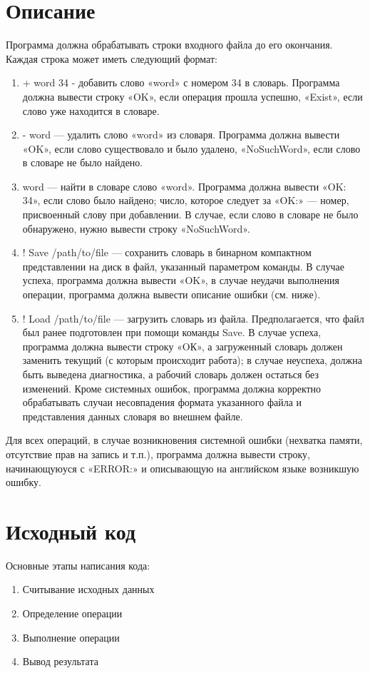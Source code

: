 \section{Описание}
Программа должна обрабатывать строки входного файла до его окончания. Каждая строка может иметь следующий формат:
\begin{enumerate}
\item + word 34 - добавить слово «word» с номером 34 в словарь.
Программа должна вывести строку «OK», если операция прошла
успешно, «Exist», если слово уже находится в словаре.
\item - word — удалить слово «word» из словаря. Программа должна
вывести «OK», если слово существовало и было удалено,
«NoSuchWord», если слово в словаре не было найдено.
\item word — найти в словаре слово «word». Программа должна вывести
«OK: 34», если слово было найдено; число, которое следует за
«OK:» — номер, присвоенный слову при добавлении. В случае,
если слово в словаре не было обнаружено, нужно вывести строку
«NoSuchWord».
\item ! Save /path/to/file — сохранить словарь в бинарном компактном
представлении на диск в файл, указанный параметром команды.
В случае успеха, программа должна вывести «OK», в случае
неудачи выполнения операции, программа должна вывести
описание ошибки (см. ниже).
\item ! Load /path/to/file — загрузить словарь из файла. Предполагается,
что файл был ранее подготовлен при помощи команды Save. В
случае успеха, программа должна вывести строку «OК», а
загруженный словарь должен заменить текущий (с которым
происходит работа); в случае неуспеха, должна быть выведена
диагностика, а рабочий словарь должен остаться без изменений.
Кроме системных ошибок, программа должна корректно
обрабатывать случаи несовпадения формата указанного файла и
представления данных словаря во внешнем файле.

\end{enumerate}


Для всех операций, в случае возникновения системной ошибки
(нехватка памяти, отсутствие прав на запись и т.п.), программа
должна вывести строку, начинающуюуся с «ERROR:» и описывающую
на английском языке возникшую ошибку.
\pagebreak

\section{Исходный код}
Основные этапы написания кода:
\begin{enumerate}
\item Считывание исходных данных
\item Определение операции 
\item Выполнение операции
\item Вывод результата
\end{enumerate}

